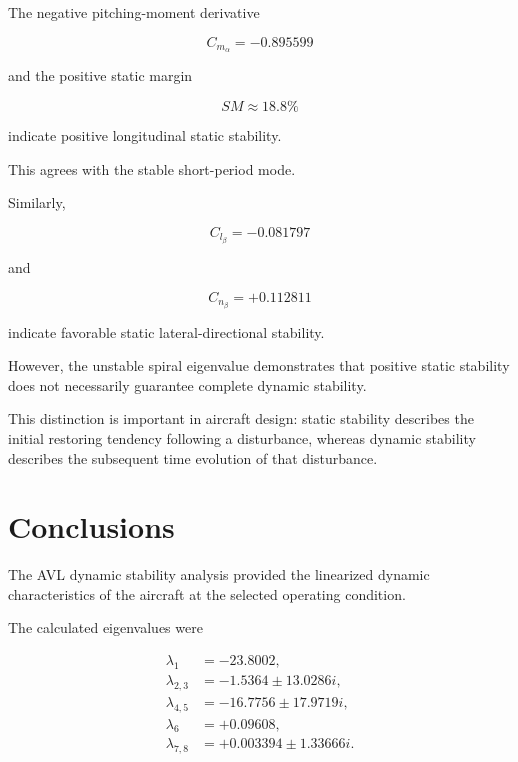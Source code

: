 \documentclass[11pt,a4paper]{article}
\begin{document}
The negative pitching-moment derivative

\begin{equation}
C_{m_\alpha}=-0.895599
\end{equation}

and the positive static margin

\begin{equation}
SM\approx18.8\%
\end{equation}

indicate positive longitudinal static stability.

This agrees with the stable short-period mode.

Similarly,

\begin{equation}
C_{l_\beta}=-0.081797
\end{equation}

and

\begin{equation}
C_{n_\beta}=+0.112811
\end{equation}

indicate favorable static lateral-directional stability.

However, the unstable spiral eigenvalue demonstrates that positive static
stability does not necessarily guarantee complete dynamic stability.

This distinction is important in aircraft design: static stability
describes the initial restoring tendency following a disturbance, whereas
dynamic stability describes the subsequent time evolution of that
disturbance.

\section{Conclusions}

The AVL dynamic stability analysis provided the linearized dynamic
characteristics of the aircraft at the selected operating condition.

The calculated eigenvalues were

\begin{equation}
\boxed{
\begin{aligned}
\lambda_1 &=-23.8002,\\
\lambda_{2,3}
&=-1.5364\pm13.0286i,\\
\lambda_{4,5}
&=-16.7756\pm17.9719i,\\
\lambda_6
&=+0.09608,\\
\lambda_{7,8}
&=+0.003394\pm1.33666i.
\end{aligned}}
\end{equation}
\end{document}
